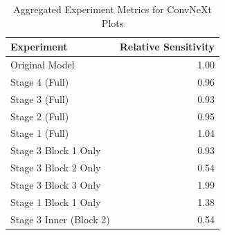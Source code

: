 \begin{table}
\caption{Aggregated Experiment Metrics for ConvNeXt Plots}
\label{tab:exp_plot_data_convnext}
\begin{tabular}{lr}
\toprule
Experiment & Relative Sensitivity \\
\midrule
Original Model & 1.00 \\
Stage 4 (Full) & 0.96 \\
Stage 3 (Full) & 0.93 \\
Stage 2 (Full) & 0.95 \\
Stage 1 (Full) & 1.04 \\
Stage 3 Block 1 Only & 0.93 \\
Stage 3 Block 2 Only & 0.54 \\
Stage 3 Block 3 Only & 1.99 \\
Stage 1 Block 1 Only & 1.38 \\
Stage 3 Inner (Block 2) & 0.54 \\
\bottomrule
\end{tabular}
\end{table}
